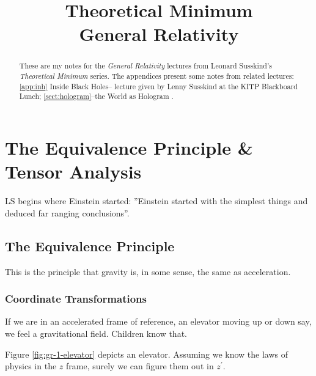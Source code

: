 \documentclass[]{article}
\title{Theoretical Minimum\\General Relativity}
\author{}
\begin{document}
\maketitle

\begin{abstract}
	These are my notes for the \emph{General Relativity}\cite{susskind2012general} lectures from Leonard Susskind's \emph{Theoretical Minimum} series\cite{susskind2007theoretical}. The appendices present some notes from related lectures: \ref{app:inh} Inside Black Holes-- lecture given by Lenny Susskind at the KITP Blackboard Lunch\cite{susskind2013inside}; \ref{sect:hologram}--the World as Hologram \cite{susskind2011hologram}.
	
\end{abstract}

\tableofcontents
\listoffigures
\listoftables
\listoftheorems

\section{The Equivalence Principle \& Tensor Analysis}

LS begins where Einstein started: ''Einstein started with the simplest things and deduced far ranging conclusions''.

\subsection{The Equivalence Principle}

This is the principle that gravity is, in some sense, the same as acceleration.

\subsubsection{Coordinate Transformations}

If we are in an accelerated frame of reference, an elevator moving up or down say, we feel a gravitational field. Children know that.

Figure \ref{fig:gr-1-elevator} depicts an elevator. Assuming we know the laws of physics in the $z$ frame, surely we can figure them out in $z^\prime$.
\end{document}
